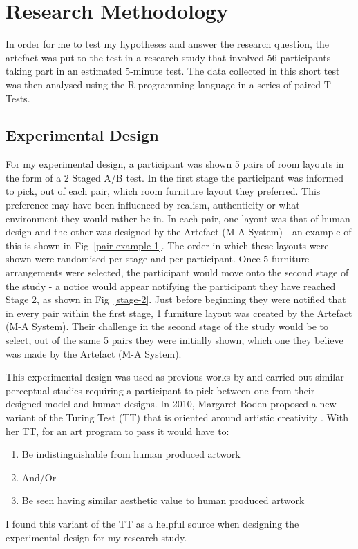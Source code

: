 \section{Research Methodology}
In order for me to test my hypotheses and answer the research question, the artefact was put to the test in a research study that involved 56 participants taking part in an estimated 5-minute test. The data collected in this short test was then analysed using the R programming language in a series of paired T-Tests.

\subsection{Experimental Design}
For my experimental design, a participant was shown 5 pairs of room layouts in the form of a 2 Staged A/B test.
In the first stage the participant was informed to pick, out of each pair, which room furniture layout they preferred. This preference may have been influenced by realism, authenticity or what environment they would rather be in. In each pair, one layout was that of human design and the other was designed by the Artefact (M-A System) - an example of this is shown in Fig~\ref{pair-example-1}. The order in which these layouts were shown were randomised per stage and per participant.
Once 5 furniture arrangements were selected, the participant would move onto the second stage of the study - a notice would appear notifying the participant they have reached Stage 2, as shown in Fig~\ref{stage-2}. Just before beginning they were notified that in every pair within the first stage, 1 furniture layout was created by the Artefact (M-A System). Their challenge in the second stage of the study would be to select, out of the same 5 pairs they were initially shown, which one they believe was made by the Artefact (M-A System).

This experimental design was used as previous works by  \cite{constrained-layouts} and  \cite{make-it-home} carried out similar perceptual studies requiring a participant to pick between one from their designed model and human designs. In 2010, Margaret Boden proposed a new variant of the Turing Test (TT) that is oriented around artistic creativity \cite{artistic-tt}. With her TT, for an art program to pass it would have to:
\begin{enumerate}
    \item Be indistinguishable from human produced artwork
    \item[]And/Or
    \item Be seen having similar aesthetic value to human produced artwork
\end{enumerate}
I found this variant of the TT as a helpful source when designing the experimental design for my research study.


